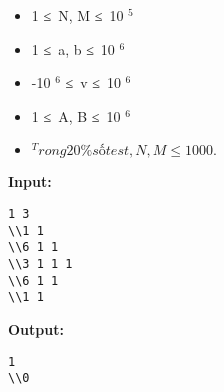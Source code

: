 \begin{itemize}
	\item     1 ≤ N, M ≤ 10    $^     5    $
	\item     1 ≤ a, b ≤ 10    $^     6    $
	\item     -10    $^     6    $    ≤ v ≤ 10    $^     6    $
	\item     1 ≤ A, B ≤ 10    $^     6    $
	\item $^     Trong 20\% số test, N, M ≤ 1000.    $
\end{itemize}
\textbf{    Input:   }
\begin{verbatim}
1 3
\\1 1
\\6 1 1 
\\3 1 1 1 
\\6 1 1
\\1 1\end{verbatim}

\textbf{    Output:   }
\begin{verbatim}
1
\\0\end{verbatim}